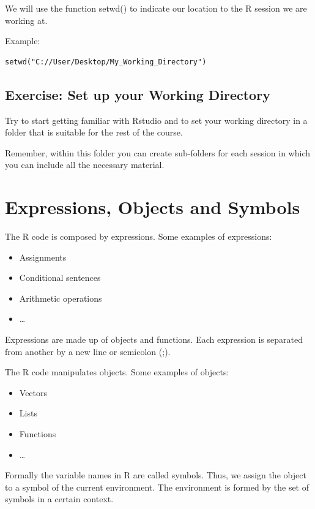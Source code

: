 \documentclass[
]{book}
\providecommand{\tightlist}{%
  \setlength{\itemsep}{0pt}\setlength{\parskip}{0pt}}
\begin{document}
We will use the function setwd() to indicate our location to the R session we are working at.

Example:

\begin{verbatim}
setwd("C://User/Desktop/My_Working_Directory")
\end{verbatim}

\hypertarget{exercise-set-up-your-working-directory}{%
\subsection{Exercise: Set up your Working Directory}\label{exercise-set-up-your-working-directory}}

Try to start getting familiar with Rstudio and to set your working directory in a folder that is suitable for the rest of the course.

Remember, within this folder you can create sub-folders for each session in which you can include all the necessary material.

\hypertarget{expressions-objects-and-symbols}{%
\section{Expressions, Objects and Symbols}\label{expressions-objects-and-symbols}}

The R code is composed by expressions. Some examples of expressions:

\begin{itemize}
\tightlist
\item
  Assignments
\item
  Conditional sentences
\item
  Arithmetic operations
\item
  \ldots{}
\end{itemize}

Expressions are made up of objects and functions. Each expression is separated from another by a new line or semicolon (;).

The R code manipulates objects. Some examples of objects:

\begin{itemize}
\tightlist
\item
  Vectors
\item
  Lists
\item
  Functions
\item
  \ldots{}
\end{itemize}

Formally the variable names in R are called symbols. Thus, we assign the object to a symbol of the current environment. The environment is formed by the set of symbols in a certain context.
\end{document}
